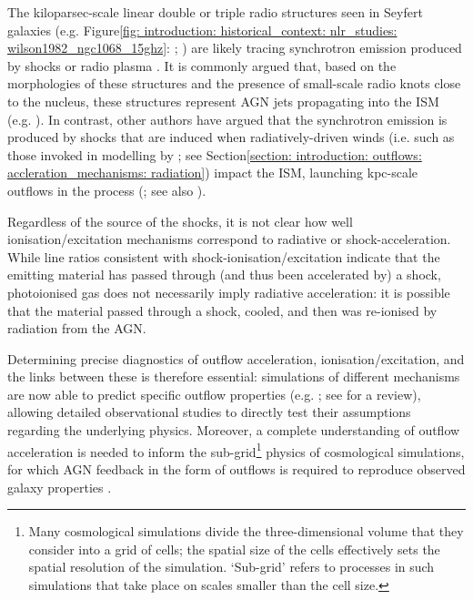The kiloparsec-scale linear double or triple radio structures seen in Seyfert galaxies (e.g. Figure\;\ref{fig: introduction: historical_context: nlr_studies: wilson1982_ngc1068_15ghz}: \citealt{Wilson1982}; \citealt{Wilson1980, Pedlar1983, Pedlar1984, Ulvestad1984}) are likely tracing synchrotron emission produced by shocks or radio plasma \citep{Wilson1980, Ulvestad1984}. It is commonly argued that, based on the morphologies of these structures and the presence of small-scale radio knots close to the nucleus, these structures represent AGN jets propagating into the ISM (e.g. \citealt{Wilson1982, Stanghellini2005, Rosario2010b, Riffel2013b, Jarvis2019, Williams2017, Girdhar2022}). In contrast, other authors have argued that the synchrotron emission is produced by shocks that are induced when radiatively-driven winds (i.e. such as those invoked in modelling by \citealt{Hopkins2010}; see Section\;\ref{section: introduction: outflows: accleration_mechanisms: radiation}) impact the ISM, launching kpc-scale outflows in the process (\citealt{Fischer2019}; see also \citealt{Fischer2023}).

Regardless of the source of the shocks, it is not clear how well ionisation/excitation mechanisms correspond to radiative or shock-acceleration. While line ratios consistent with shock-ionisation/excitation indicate that the emitting material has passed through (and thus been accelerated by) a shock, photoionised gas does not necessarily imply radiative acceleration: it is possible that the material passed through a shock, cooled, and then was re-ionised by radiation from the AGN. 

Determining precise diagnostics of outflow acceleration, ionisation/excitation, and the links between these is therefore essential: simulations of different mechanisms are now able to predict specific outflow properties (e.g. \citealt{Richings2021, Meenakshi2022a, Meenakshi2022b}; see \citealt{Krause2023} for a review), allowing detailed observational studies to directly test their assumptions regarding the underlying physics. Moreover, a complete understanding of outflow acceleration is needed to inform the sub-grid\footnote{Many cosmological simulations divide the three-dimensional volume that they consider into a grid of cells; the spatial size of the cells effectively sets the spatial resolution of the simulation. `Sub-grid' refers to processes in such simulations that take place on scales smaller than the cell size.} physics of cosmological simulations, for which AGN feedback in the form of outflows is required to reproduce observed galaxy properties \citep{Schaye2015, Dubois2016, Dave2019, Zinger2020}.

